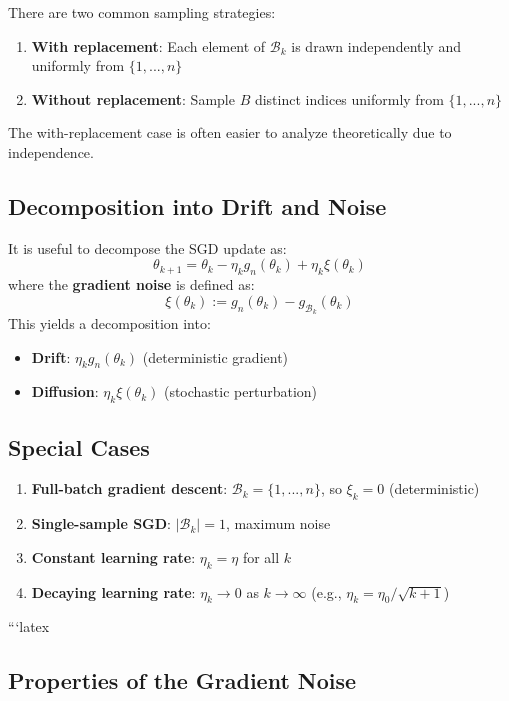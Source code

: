\documentclass[11pt]{article}
\begin{document}
There are two common sampling strategies:

\begin{enumerate}
    \item \textbf{With replacement}: Each element of $\mathcal{B}_k$ is drawn independently and uniformly from $\{1, ..., n\}$
    \item \textbf{Without replacement}: Sample $B$ distinct indices uniformly from $\{1, ..., n\}$
\end{enumerate}

The with-replacement case is often easier to analyze theoretically due to independence.

\subsection{Decomposition into Drift and Noise}

It is useful to decompose the SGD update as:
$$\theta_{k+1} = \theta_k - \eta_k g_n(\theta_k) + \eta_k \xi(\theta_k)$$
where the \textbf{gradient noise} is defined as:
$$\xi(\theta_k) := g_n(\theta_k) - g_{\mathcal{B}_k}(\theta_k)$$
This yields a decomposition into:
\begin{itemize}
    \item \textbf{Drift}: $\eta_k g_n(\theta_k)$ (deterministic gradient)
    \item \textbf{Diffusion}: $\eta_k \xi(\theta_k)$ (stochastic perturbation)
\end{itemize}

\subsection{Special Cases}

\begin{enumerate}
    \item \textbf{Full-batch gradient descent}: $\mathcal{B}_k = \{1, ..., n\}$, so $\xi_k = 0$ (deterministic)
    \item \textbf{Single-sample SGD}: $|\mathcal{B}_k| = 1$, maximum noise
    \item \textbf{Constant learning rate}: $\eta_k = \eta$ for all $k$
    \item \textbf{Decaying learning rate}: $\eta_k \to 0$ as $k \to \infty$ (e.g., $\eta_k = \eta_0/\sqrt{k+1}$)
\end{enumerate}

```latex
\subsection{Properties of the Gradient Noise}
\end{document}
